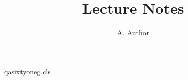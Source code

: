 \begin{filecontents*}[overwrite]{qasixtyoneg.cls}
\newcommand\mail[1]{\gdef\@mail{#1}}
\renewcommand\@maketitle{\begin{center}{\LARGE \@title\par}{\large \@author\par}\end{center}
  {\bfseries E-mail:} \texttt{\@mail} (corresponding author)\par}
\end{filecontents*}
\documentclass{qasixtyoneg}
\title{Lecture Notes}
\author{A. Author}

\maketitle
Text.

